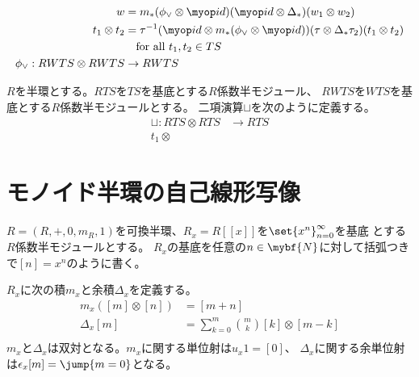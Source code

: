 	\begin{equation}\begin{split} %
	\end{split}\end{equation} %
	\begin{equation}\begin{split} %
			w &= m_*(\phi_\vee\otimes \myid)(\myid\otimes \Delta_*)(w_1\otimes w_2 ) \\
			t_1\otimes t_2 &= \tau^{-1}(\myid\otimes m_*(\phi_\vee\otimes \myid))(\tau\otimes \Delta_*\tau_2)(t_1\otimes t_2) \\
			&\quad\text{for all }t_1,t_2\in TS \\
		\phi_\vee: RWTS\otimes RWTS &\to RWTS \\
	\end{split}\end{equation} %

	$R$を半環とする。$RTS$を$TS$を基底とする$R$係数半モジュール、
	$RWTS$を$WTS$を基底とする$R$係数半モジュールとする。
	二項演算$\sqcup$を次のように定義する。
	\begin{equation}\begin{split} %
		\sqcup: RTS\otimes RTS &\to RTS \\
			t_1\otimes 
	\end{split}\end{equation} %

\section{モノイド半環の自己線形写像}\label{s1:モノイド半環の自己線形写像} %
	$R=(R,+,0,m_R,1)$を可換半環、$R_x=R[[x]]$を$\set{x^n}_{n=0}^\infty$を基底
	とする$R$係数半モジュールとする。
	$R_x$の基底を任意の$n\in \mybf{N}$に対して括弧つきで$[n]=x^n$のように書く。

	$R_x$に次の積$m_x$と余積$\Delta_x$を定義する。
	\begin{equation}\label{eq:多項式の積と余積}\begin{split} %
		m_x([m]\otimes[n]) &= [m+n] \\
		\Delta_x[m] &= \sum_{k=0}^m\binom{m}{k}[k]\otimes[m-k] \\
	\end{split}\end{equation} %
	$m_x$と$\Delta_x$は双対となる。$m_x$に関する単位射は$u_x1=[0]$、
	$\Delta_x$に関する余単位射は$\epsilon_x[m]=\jump{m=0}$となる。


